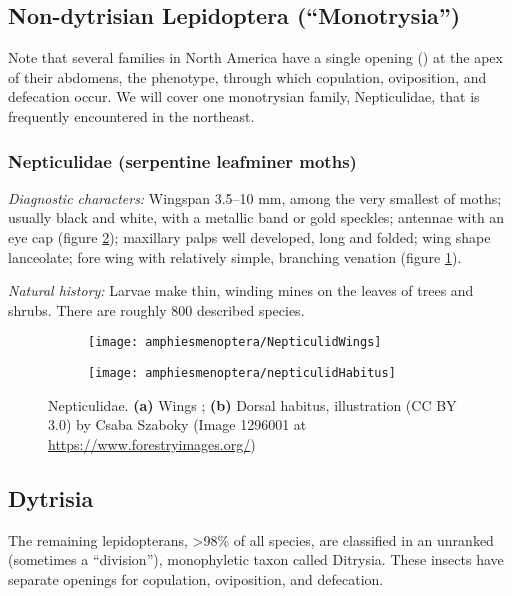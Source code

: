 \subsection{Non-dytrisian Lepidoptera (``Monotrysia'')}
Note that several families in North America have a single opening () at the apex of their abdomens, the  phenotype, through which copulation, oviposition, and defecation occur. We will cover one monotrysian family, Nepticulidae, that is frequently encountered in the northeast.%

\subsubsection{Nepticulidae (serpentine leafminer moths)}
\noindent{}\textit{Diagnostic characters:} Wingspan 3.5--10 mm, among the very smallest of moths; usually black and white, with a metallic band or gold speckles; antennae with an eye cap (figure \ref{fig:nepticulid1}); maxillary palps well developed, long and folded; wing shape lanceolate; fore wing with relatively simple, branching venation (figure \ref{fig:nepticulid2}).\vspace{3mm}

\noindent{}\textit{Natural history:} Larvae make thin, winding mines on the leaves of trees and shrubs. There are roughly 800 described species.\vspace{3mm}

\begin{figure}[ht!]
    \centering
    \begin{subfigure}[ht!]{0.42\textwidth}
        \texttt{[image: amphiesmenoptera/NepticulidWings]}
        \caption{}
        \label{fig:nepticulid2}
    \end{subfigure}
    \hfill
    \begin{subfigure}[ht!]{0.45\textwidth}
        \texttt{[image: amphiesmenoptera/nepticulidHabitus]}
        \caption{}
        \label{fig:nepticulid1}
    \end{subfigure}
    \caption{Nepticulidae. \textbf{(a)} Wings \citep[][Fig. 1]{braun1917nepticulids}; \textbf{(b)} Dorsal habitus, illustration (CC BY 3.0) by Csaba Szaboky (Image 1296001 at \url{https://www.forestryimages.org/})}\label{fig:nepticulids}
\end{figure}

\subsection{Dytrisia}
The remaining lepidopterans, \textgreater98\% of all species, are classified in an unranked (sometimes a ``division''), monophyletic taxon called Ditrysia. These insects have separate openings for copulation, oviposition, and defecation.

